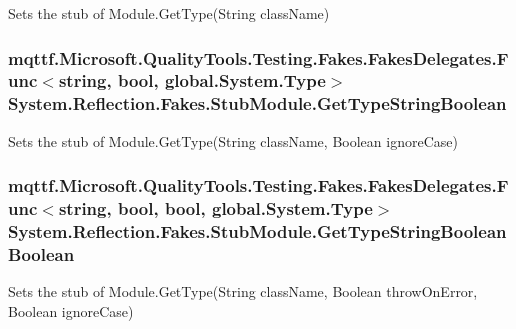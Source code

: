 Sets the stub of Module.\-Get\-Type(\-String class\-Name)

\hypertarget{class_system_1_1_reflection_1_1_fakes_1_1_stub_module_a9fbb4fc421f7ea782fc931ed46448033}{
\subsubsection[{Get\-Type\-String\-Boolean}]{\setlength{\rightskip}{0pt plus 5cm}mqttf.\-Microsoft.\-Quality\-Tools.\-Testing.\-Fakes.\-Fakes\-Delegates.\-Func$<$string, bool, global.\-System.\-Type$>$ System.\-Reflection.\-Fakes.\-Stub\-Module.\-Get\-Type\-String\-Boolean}}\label{class_system_1_1_reflection_1_1_fakes_1_1_stub_module_a9fbb4fc421f7ea782fc931ed46448033}


Sets the stub of Module.\-Get\-Type(\-String class\-Name, Boolean ignore\-Case)

\hypertarget{class_system_1_1_reflection_1_1_fakes_1_1_stub_module_a2a58e957699d71fb6b3cfbb0033ed96a}{
\subsubsection[{Get\-Type\-String\-Boolean\-Boolean}]{\setlength{\rightskip}{0pt plus 5cm}mqttf.\-Microsoft.\-Quality\-Tools.\-Testing.\-Fakes.\-Fakes\-Delegates.\-Func$<$string, bool, bool, global.\-System.\-Type$>$ System.\-Reflection.\-Fakes.\-Stub\-Module.\-Get\-Type\-String\-Boolean\-Boolean}}\label{class_system_1_1_reflection_1_1_fakes_1_1_stub_module_a2a58e957699d71fb6b3cfbb0033ed96a}


Sets the stub of Module.\-Get\-Type(\-String class\-Name, Boolean throw\-On\-Error, Boolean ignore\-Case)

